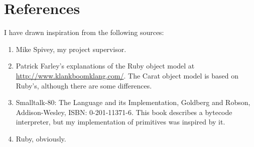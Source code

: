 \section{References}

I have drawn inspiration from the following sources:

\begin{enumerate}
  \item Mike Spivey, my project supervisor.
  
  \item Patrick Farley's explanations of the Ruby object model at \url{http://www.klankboomklang.com/}. The Carat object model is based on Ruby's, although there are some differences.
  
  \item Smalltalk-80: The Language and its Implementation, Goldberg and Robson, Addison-Wesley, ISBN: 0-201-11371-6. This book describes a bytecode interpreter, but my implementation of primitives was inspired by it.
  
  \item Ruby, obviously.
\end{enumerate}
